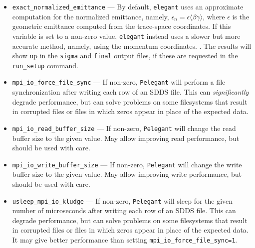 \documentclass[11pt]{article}
\begin{document}
\begin{itemize}
  \begin{itemize}
    \item 1 --- This is the original default, which showed issues in some simulations. The seed on the $i^{th}$ processor is $s_0+2*i$.
    \item 2 --- The seed on the $i^{th}$ processor is $s_0+2*i^2$.
    \item 3 --- This is the new default. The seed on the $i^{th}$ processor is $s_0+i*(i+1)$.
    \item 4 --- The seed on the $i^{th}$ processor is $s_0+R_i$, where $R_i$ is the $i^{th}$ random integer returned by
      the system rand() function.
    \end{itemize}
\item \verb|exact_normalized_emittance| --- By default, \verb|elegant| uses an approximate computation for the normalized emittance, namely,
$\epsilon_n = \epsilon\langle\beta\gamma\rangle$, where $\epsilon$ is the geometric emittance computed from the trace-space coordinates.
If this variable is set to a non-zero value, \verb|elegant| instead uses a slower but more accurate method, namely, using the momentum coordinates.
\cite{Floettmann-PRSTAB6-034202}. The results will show up in the \verb|sigma| and \verb|final| output files, if these are requested in the \verb|run_setup| command.
\item \verb|mpi_io_force_file_sync|  --- If non-zero, \verb|Pelegant| will perform a file synchronization after writing each row of
  an SDDS file. This can {\em significantly} degrade performance, but can solve problems on some filesystems that result in corrupted files
  or files in which zeros appear in place of the expected data.
\item \verb|mpi_io_read_buffer_size|  --- If non-zero, \verb|Pelegant| will change the read buffer size to the given value. 
  May allow improving read performance, but should be used with care.
\item \verb|mpi_io_write_buffer_size|  --- If non-zero, \verb|Pelegant| will change the write buffer size to the given value. 
  May allow improving write performance, but should be used with care.
\item \verb|usleep_mpi_io_kludge|  --- If non-zero, \verb|Pelegant| will sleep for the given number of microseconds after
  writing each row of an SDDS file. This can degrade performance, but can solve problems on some filesystems that result in corrupted files
  or files in which zeros appear in place of the expected data.
  It may give better performance than setting \verb|mpi_io_force_file_sync=1|.

\end{itemize}
\end{document}
